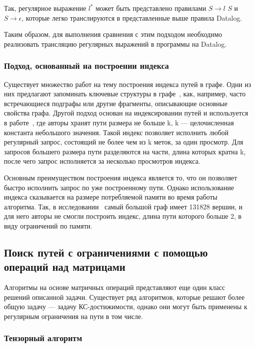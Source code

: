     Так, регулярное выражение $l^*$ может быть представлено правилами $S \rightarrow l$ $S$ и $S \rightarrow \epsilon$, которые легко транслируются в представленные выше правила Datalog.

Таким образом, для выполнения сравнения с этим подходом необходимо реализовать трансляцию регулярных выражений в программы на Datalog.

\subsubsection{Подход, основанный на построении индекса}

Существует множество работ на тему построения индекса путей в графе. Одни из них предлагают запоминать ключевые структуры в графе~\cite{related_frequent_fragments}, как, например, часто встречающиеся подграфы или другие фрагменты, описывающие основные свойства графа. Другой подход основан на индексировании путей и используется в работе~\cite{related_fletcher}, где авторы хранят пути размера не больше k, k --- целочисленная константа небольшого значения. Такой индекс позволяет исполнить любой регулярный запрос, состоящий не более чем из k меток, за один просмотр. Для запросов большего размера пути разделяются на части, длина которых кратна k, после чего запрос исполняется за несколько просмотров индекса.

Основным преимуществом построения индекса является то, что он позволяет быстро исполнить запрос по уже построенному пути. Однако использование индекса сказывается на размере потребляемой памяти во время работы алгоритма. Так, в исследовании~\cite{related_fletcher} самый большой граф имеет 131828 вершин, и для него авторы не смогли построить индекс, длина пути которого больше 2, в виду ограничений по памяти.

\subsection{Поиск путей с ограничениями с помощью операций над матрицами}\label{2.4matr}

Алгоритмы на основе матричных операций представляют еще один класс решений описанной задачи. Существует ряд алгоритмов, которые решают более общую задачу --- задачу КС-достижимости, однако они могут быть применены к регулярным ограничения на пути в том числе.

\subsubsection{Тензорный алгоритм}

